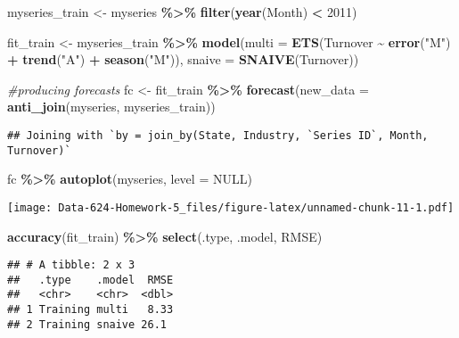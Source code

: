\documentclass[
]{article}
\newenvironment{Shaded}{\begin{snugshade}}{\end{snugshade}}
\newcommand{\AttributeTok}[1]{\textcolor[rgb]{0.13,0.29,0.53}{#1}}
\newcommand{\CommentTok}[1]{\textcolor[rgb]{0.56,0.35,0.01}{\textit{#1}}}
\newcommand{\ConstantTok}[1]{\textcolor[rgb]{0.56,0.35,0.01}{#1}}
\newcommand{\DecValTok}[1]{\textcolor[rgb]{0.00,0.00,0.81}{#1}}
\newcommand{\FunctionTok}[1]{\textcolor[rgb]{0.13,0.29,0.53}{\textbf{#1}}}
\newcommand{\NormalTok}[1]{#1}
\newcommand{\OtherTok}[1]{\textcolor[rgb]{0.56,0.35,0.01}{#1}}
\newcommand{\SpecialCharTok}[1]{\textcolor[rgb]{0.81,0.36,0.00}{\textbf{#1}}}
\newcommand{\StringTok}[1]{\textcolor[rgb]{0.31,0.60,0.02}{#1}}
\begin{document}
\begin{Shaded}
\begin{Highlighting}[]
\NormalTok{myseries\_train }\OtherTok{\textless{}{-}}\NormalTok{ myseries }\SpecialCharTok{\%\textgreater{}\%}
  \FunctionTok{filter}\NormalTok{(}\FunctionTok{year}\NormalTok{(Month) }\SpecialCharTok{\textless{}} \DecValTok{2011}\NormalTok{)}

\NormalTok{fit\_train }\OtherTok{\textless{}{-}}\NormalTok{ myseries\_train }\SpecialCharTok{\%\textgreater{}\%}
  \FunctionTok{model}\NormalTok{(}\AttributeTok{multi =} \FunctionTok{ETS}\NormalTok{(Turnover }\SpecialCharTok{\textasciitilde{}} \FunctionTok{error}\NormalTok{(}\StringTok{"M"}\NormalTok{) }\SpecialCharTok{+} \FunctionTok{trend}\NormalTok{(}\StringTok{"A"}\NormalTok{) }\SpecialCharTok{+} \FunctionTok{season}\NormalTok{(}\StringTok{"M"}\NormalTok{)),}
        \AttributeTok{snaive =} \FunctionTok{SNAIVE}\NormalTok{(Turnover))}

\CommentTok{\#producing forecasts}
\NormalTok{fc }\OtherTok{\textless{}{-}}\NormalTok{ fit\_train }\SpecialCharTok{\%\textgreater{}\%}
  \FunctionTok{forecast}\NormalTok{(}\AttributeTok{new\_data =} \FunctionTok{anti\_join}\NormalTok{(myseries, myseries\_train))}
\end{Highlighting}
\end{Shaded}

\begin{verbatim}
## Joining with `by = join_by(State, Industry, `Series ID`, Month, Turnover)`
\end{verbatim}

\begin{Shaded}
\begin{Highlighting}[]
\NormalTok{fc }\SpecialCharTok{\%\textgreater{}\%} \FunctionTok{autoplot}\NormalTok{(myseries, }\AttributeTok{level =} \ConstantTok{NULL}\NormalTok{)}
\end{Highlighting}
\end{Shaded}

\texttt{[image: Data-624-Homework-5\_files/figure-latex/unnamed-chunk-11-1.pdf]}

\begin{Shaded}
\begin{Highlighting}[]
\FunctionTok{accuracy}\NormalTok{(fit\_train) }\SpecialCharTok{\%\textgreater{}\%}
  \FunctionTok{select}\NormalTok{(.type, .model, RMSE)}
\end{Highlighting}
\end{Shaded}

\begin{verbatim}
## # A tibble: 2 x 3
##   .type    .model  RMSE
##   <chr>    <chr>  <dbl>
## 1 Training multi   8.33
## 2 Training snaive 26.1
\end{verbatim}
\end{document}
